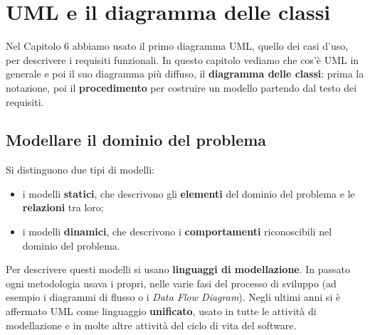 \chapter{UML e il diagramma delle classi}

Nel Capitolo 6 abbiamo usato il primo diagramma UML, quello dei casi d'uso, per descrivere i requisiti funzionali. In questo
capitolo vediamo che cos'è UML in generale e poi il suo diagramma più diffuso, il \textbf{diagramma delle classi}: prima la
notazione, poi il \textbf{procedimento} per costruire un modello partendo dal testo dei requisiti.

\section{Modellare il dominio del problema}



Si distinguono due tipi di modelli:
\begin{itemize}
  \item i modelli \textbf{statici}, che descrivono gli \textbf{elementi} del dominio del problema e le \textbf{relazioni} tra loro;
  \item i modelli \textbf{dinamici}, che descrivono i \textbf{comportamenti} riconoscibili nel dominio del problema.
\end{itemize}

Per descrivere questi modelli si usano \textbf{linguaggi di modellazione}. In passato ogni metodologia usava i propri, nelle varie
fasi del processo di sviluppo (ad esempio i diagrammi di flusso o i \textit{Data Flow Diagram}). Negli ultimi anni si è affermato
UML come linguaggio \textbf{unificato}, usato in tutte le attività di modellazione e in molte altre attività del ciclo di vita
del software.

